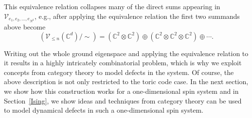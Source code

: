This equivalence relation collapses many of the direct sums appearing in $\mathcal{V}_{e_1,e_2,\ldots,e_{N^2}}$, e.g., after applying the equivalence relation the first two summands above become
\begin{equation}
	\left(\mathcal{V}_{\le n}(\mathbb{C}^d)/\sim\right) = (\mathbb{C}^2\otimes \mathbb{C}^2)\oplus (\mathbb{C}^2\otimes \mathbb{C}^2\otimes \mathbb{C}^2)\oplus \cdots.
\end{equation}

Writing out the whole ground eigenspace and applying the equivalence relation to it results in a highly intricately combinatorial problem, which is why we exploit concepts from category theory to model defects in the system. Of course, the above description is not only restricted to the toric code case. In the next section, we show how this construction works for a one-dimensional spin system and in Section~\ref{Ising}, we show ideas and techniques from category theory can be used to model dynamical defects in such a one-dimensional spin system.

  